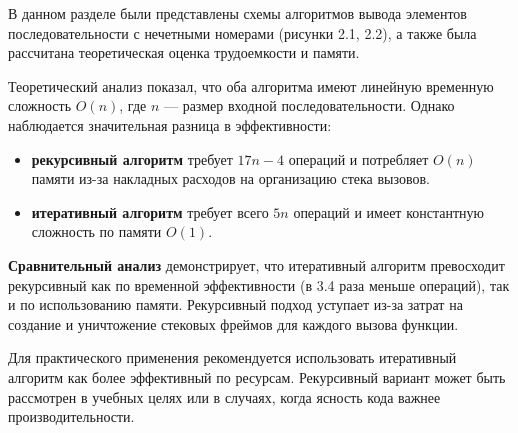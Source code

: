 В данном разделе были представлены схемы алгоритмов вывода элементов последовательности с нечетными номерами (рисунки 2.1, 2.2), а также была рассчитана теоретическая оценка трудоемкости и памяти.

Теоретический анализ показал, что оба алгоритма имеют линейную временную сложность $O(n)$, где $n$ — размер входной последовательности. Однако наблюдается значительная разница в эффективности:

\begin{itemize}
	\item \textbf{рекурсивный алгоритм} требует $17n - 4$ операций и потребляет $O(n)$ памяти из-за накладных расходов на организацию стека вызовов.
	\item \textbf{итеративный алгоритм} требует всего $5n$ операций и имеет константную сложность по памяти $O(1)$.
\end{itemize}

\textbf{Сравнительный анализ} демонстрирует, что итеративный алгоритм превосходит рекурсивный как по временной эффективности (в 3.4 раза меньше операций), так и по использованию памяти. Рекурсивный подход уступает из-за затрат на создание и уничтожение стековых фреймов для каждого вызова функции.

Для практического применения рекомендуется использовать итеративный алгоритм как более эффективный по ресурсам. Рекурсивный вариант может быть рассмотрен в учебных целях или в случаях, когда ясность кода важнее производительности.